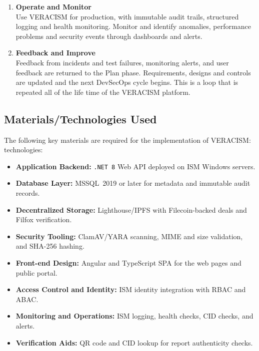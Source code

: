 \begin{enumerate}
    \item \textbf{Operate and Monitor} \\
    Use VERACISM for production, with immutable audit trails, structured logging and health monitoring. Monitor and identify anomalies, performance problems and security events through dashboards and alerts.

    \item \textbf{Feedback and Improve} \\
    Feedback from incidents and test failures, monitoring alerts, and user feedback are returned to the Plan phase. Requirements, designs and controls are updated and the next DevSecOps cycle begins. This is a loop that is repeated all of the life time of the VERACISM platform.
\end{enumerate}

\clearpage

\subsection{Materials/Technologies Used}
The following key materials are required for the implementation of VERACISM:
technologies:
\begin{itemize}
    \item \textbf{Application Backend:} \texttt{.NET~8} Web API deployed on ISM Windows servers.
    \item \textbf{Database Layer:} MSSQL~2019 or later for metadata and immutable audit records.
    \item \textbf{Decentralized Storage:} Lighthouse/IPFS with Filecoin-backed deals and Filfox verification.
    \item \textbf{Security Tooling:} ClamAV/YARA scanning, MIME and size validation, and SHA-256 hashing.
    \item \textbf{Front-end Design:} Angular and TypeScript SPA for the web pages and public portal.
    \item \textbf{Access Control and Identity:} ISM identity integration with RBAC and ABAC.
    \item \textbf{Monitoring and Operations:} ISM logging, health checks, CID checks, and alerts.
    \item \textbf{Verification Aids:} QR code and CID lookup for report authenticity checks.
\end{itemize}

